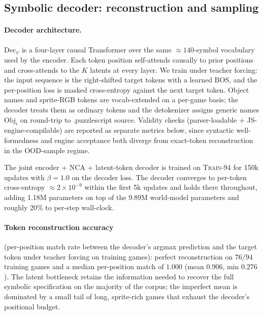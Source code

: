 
\subsection{Symbolic decoder: reconstruction and sampling}
\label{app:autoencoder}

\paragraph{Decoder architecture.}
$\mathrm{Dec}_\psi$ is a four-layer causal Transformer over the same
$\approx 140$-symbol vocabulary used by the encoder. Each token position
self-attends causally to prior positions and cross-attends to the
$K$ latents at every layer. We train under teacher forcing: the input
sequence is the right-shifted target tokens with a learned BOS, and
the per-position loss is masked cross-entropy against the next
target token. Object names and sprite-RGB tokens are vocab-extended
on a per-game basis; the decoder treats them as ordinary tokens and
the detokenizer assigns generic names $\mathrm{Obj}_i$ on round-trip
to .puzzlescript source. Validity checks (parser-loadable +
JS-engine-compilable) are reported as separate metrics below, since
syntactic well-formedness and engine acceptance both diverge from
exact-token reconstruction in the OOD-sample regime.

The joint encoder + NCA + latent-token decoder is trained on
\textsc{Train-94} for 150k updates with $\beta = 1.0$ on the decoder
loss. The decoder converges to per-token cross-entropy
$\approx 2 \times 10^{-9}$ within the first 5k updates and holds
there throughout, adding 1.18M parameters on top of the 9.89M
world-model parameters and roughly 20\% to per-step wall-clock.

\paragraph{Token reconstruction accuracy} (per-position match rate
between the decoder's argmax prediction and the target token under
teacher forcing on training games): perfect reconstruction on
$76/94$ training games and a median per-position match of $1.000$
(mean $0.906$, min $0.276$). The latent bottleneck retains the
information needed to recover the full symbolic specification on the
majority of the corpus; the imperfect mean is dominated by a small
tail of long, sprite-rich games that exhaust the decoder's
positional budget.

